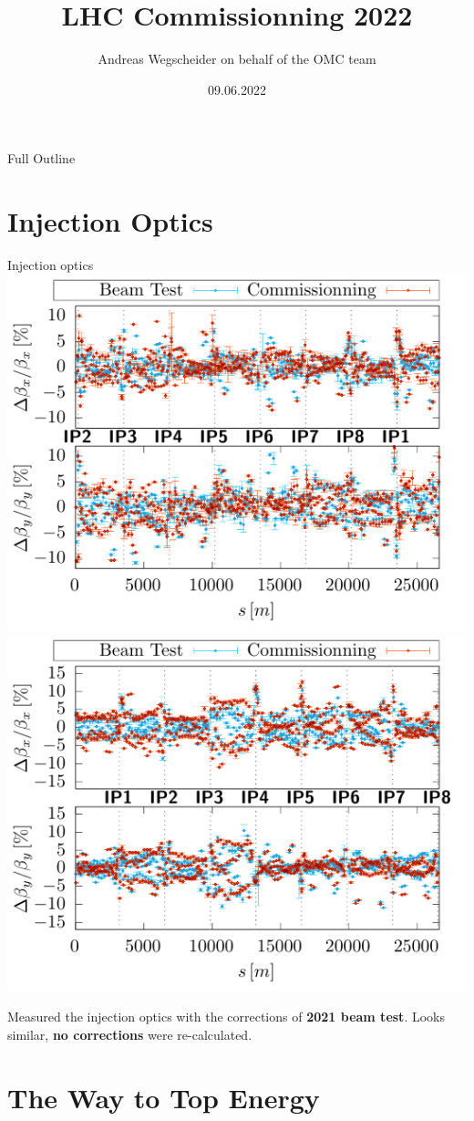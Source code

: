 \documentclass[11pt,usenames,dvipsnames,aspectration=169]{beamer}
\author[OMC]{Andreas Wegscheider on behalf of the OMC team}
\title[LHC 2022]{LHC Commissionning 2022}
\institute{CERN}
\date[09.06.22]{09.06.2022}
\newcommand{\highl}[1]{\textbf{#1}}
\begin{document}


\begin{frame}
    \titlepage
\end{frame}


\begin{frame}{Full Outline}
\tableofcontents
\end{frame}
\small

\section{Injection Optics}
\begin{frame}{Injection optics}
    \includegraphics[width=0.49\linewidth]{images/beamtest/b1_bb.pdf}
    \hfill
    \includegraphics[width=0.49\linewidth]{images/beamtest/b2_bb.pdf}
    
    Measured the injection optics with the corrections of \highl{2021 beam test}.
    Looks similar, \highl{no corrections} were re-calculated.
\end{frame}

\section{The Way to Top Energy}
\end{document}

